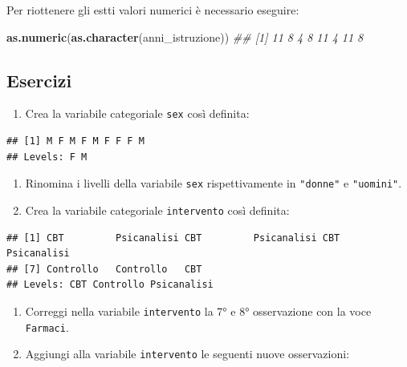 \documentclass[
]{book}
\newenvironment{Shaded}{\begin{snugshade}}{\end{snugshade}}
\newcommand{\CommentTok}[1]{\textcolor[rgb]{0.56,0.35,0.01}{\textit{#1}}}
\newcommand{\KeywordTok}[1]{\textcolor[rgb]{0.13,0.29,0.53}{\textbf{#1}}}
\newcommand{\NormalTok}[1]{#1}
\providecommand{\tightlist}{%
  \setlength{\itemsep}{0pt}\setlength{\parskip}{0pt}}
\begin{document}
Per riottenere gli estti valori numerici è necessario eseguire:

\begin{Shaded}
\begin{Highlighting}[]
\KeywordTok{as.numeric}\NormalTok{(}\KeywordTok{as.character}\NormalTok{(anni_istruzione))}
\CommentTok{## [1] 11  8  4  8 11  4 11  8}
\end{Highlighting}
\end{Shaded}

\hypertarget{esercizi-5}{%
\subsection*{Esercizi}\label{esercizi-5}}

\begin{enumerate}
\def\labelenumi{\arabic{enumi}.}
\tightlist
\item
  Crea la variabile categoriale \texttt{sex} così definita:
\end{enumerate}

\begin{verbatim}
## [1] M F M F M F F F M
## Levels: F M
\end{verbatim}

\begin{enumerate}
\def\labelenumi{\arabic{enumi}.}
\setcounter{enumi}{1}
\tightlist
\item
  Rinomina i livelli della variabile \texttt{sex} rispettivamente in \texttt{"donne"} e \texttt{"uomini"}.
\item
  Crea la variabile categoriale \texttt{intervento} così definita:
\end{enumerate}

\begin{verbatim}
## [1] CBT         Psicanalisi CBT         Psicanalisi CBT         Psicanalisi
## [7] Controllo   Controllo   CBT        
## Levels: CBT Controllo Psicanalisi
\end{verbatim}

\begin{enumerate}
\def\labelenumi{\arabic{enumi}.}
\setcounter{enumi}{3}
\tightlist
\item
  Correggi nella variabile \texttt{intervento} la 7° e 8° osservazione con la voce \texttt{Farmaci}.
\item
  Aggiungi alla variabile \texttt{intervento} le seguenti nuove osservazioni:
\end{enumerate}
\end{document}
